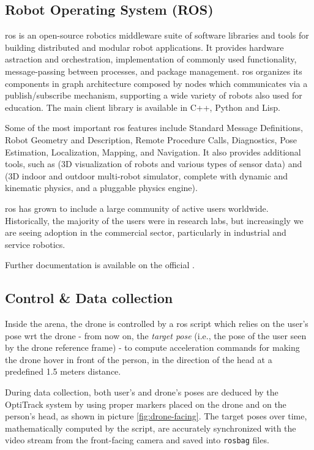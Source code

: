 \subsection{Robot Operating System (ROS)}
\label{subsec:ROS}

\gls{ros} is an open-source robotics middleware suite of software libraries and tools for building distributed and modular robot applications. It provides hardware astraction and orchestration, implementation of commonly used functionality, message-passing between processes, and package management. \gls{ros} organizes its components in graph architecture composed by nodes which communicates via a publish/subscribe mechanism, supporting a wide variety of robots also used for education. The main client library is available in C++, Python and Lisp.

Some of the most important \gls{ros} features include Standard Message Definitions, Robot Geometry and Description, Remote Procedure Calls, Diagnostics, Pose Estimation, Localization, Mapping, and Navigation. It also provides additional tools, such as \cite{rviz} (3D visualization of robots and various types of sensor data) and \cite{Gazebo} (3D indoor and outdoor multi-robot simulator, complete with dynamic and kinematic physics, and a pluggable physics engine).

\medskip

\gls{ros} has grown to include a large community of active users worldwide. Historically, the majority of the users were in research labs, but increasingly we are seeing adoption in the commercial sector, particularly in industrial and service robotics.

Further documentation is available on the official \cite{ROS}.



\subsection{Control \& Data collection}
\label{subsec:control}

Inside the arena, the drone is controlled by a \gls{ros} script which relies on the user's pose \gls{wrt} the drone - from now on, the \textit{target pose} (i.e., the pose of the user seen by the drone reference frame) - to compute acceleration commands for making the drone hover in front of the person, in the direction of the head at a predefined 1.5 meters distance. 

\medskip

During data collection, both user's and drone's poses are deduced by the OptiTrack system by using proper markers placed on the drone and on the person's head, as shown in picture \ref{fig:drone-facing}. The target poses over time, mathematically computed by the script, are accurately synchronized with the video stream from the front-facing camera and saved into \texttt{rosbag} files.

